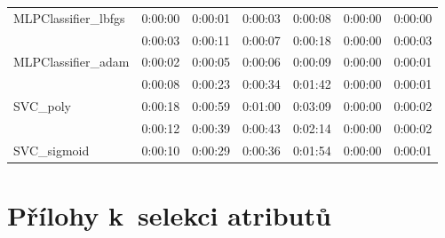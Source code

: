 \begin{table}[H]
{\begin{tabular}{lllllll}
    \multicolumn{1}{l|}{MLPClassifier\_lbfgs}                                     & 0:00:00 & 0:00:01                       & 0:00:03 & 0:00:08                       & 0:00:00     & 0:00:00     \\
    \rowcolor[HTML]{EFEFEF} 
    \multicolumn{1}{l|}{\cellcolor[HTML]{EFEFEF}MLPClassifier\_sgd}               & 0:00:03 & 0:00:11                       & 0:00:07 & 0:00:18                       & 0:00:00     & 0:00:03     \\
    \multicolumn{1}{l|}{MLPClassifier\_adam}                                      & 0:00:02 & 0:00:05                       & 0:00:06 & 0:00:09                       & 0:00:00     & 0:00:01     \\
    \rowcolor[HTML]{EFEFEF} 
    \multicolumn{1}{l|}{\cellcolor[HTML]{EFEFEF}SVC\_linear}                      & 0:00:08 & 0:00:23                       & 0:00:34 & 0:01:42                       & 0:00:00     & 0:00:01     \\
    \multicolumn{1}{l|}{SVC\_poly}                                                & 0:00:18 & 0:00:59                       & 0:01:00 & 0:03:09                       & 0:00:00     & 0:00:02     \\
    \rowcolor[HTML]{EFEFEF} 
    \multicolumn{1}{l|}{\cellcolor[HTML]{EFEFEF}SVC\_rbf}                         & 0:00:12 & 0:00:39                       & 0:00:43 & 0:02:14                       & 0:00:00     & 0:00:02     \\
    \multicolumn{1}{l|}{SVC\_sigmoid}                                             & 0:00:10 & 0:00:29                       & 0:00:36 & 0:01:54                       & 0:00:00     & 0:00:01    
    \end{tabular}}
\end{table}

\chapter{Přílohy k~selekci atributů}
\label{prilohy_k_selekci_atributu}

